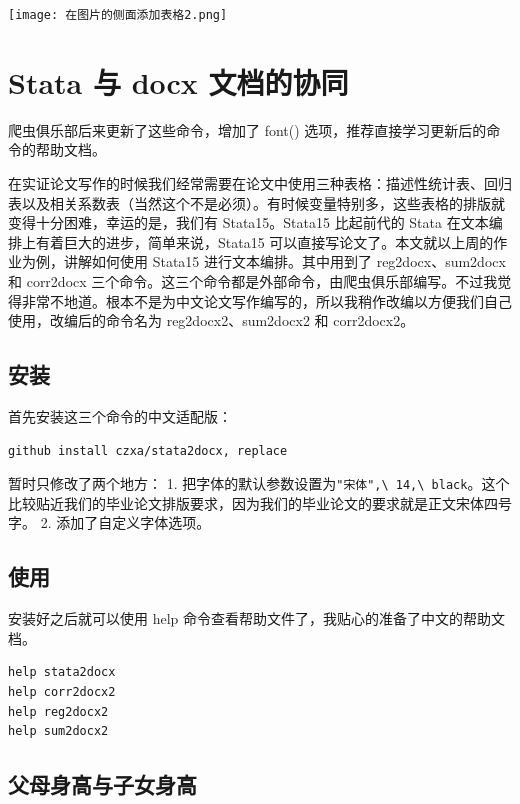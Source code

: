 \documentclass[cn,fancy,blue,11pt]{elegantbook}
\begin{document}
\noindent\texttt{[image: 在图片的侧面添加表格2.png]}

\hypertarget{stata--docx-}{%
\chapter{Stata 与 docx 文档的协同}\label{stata--docx-}}

\begin{note}
  爬虫俱乐部后来更新了这些命令，增加了 font() 选项，推荐直接学习更新后的命令的帮助文档。
\end{note}

在实证论文写作的时候我们经常需要在论文中使用三种表格：描述性统计表、回归表以及相关系数表（当然这个不是必须）。有时候变量特别多，这些表格的排版就变得十分困难，幸运的是，我们有 Stata15。Stata15 比起前代的 Stata 在文本编排上有着巨大的进步，简单来说，Stata15 可以直接写论文了。本文就以上周的作业为例，讲解如何使用 Stata15 进行文本编排。其中用到了 reg2docx、sum2docx 和 corr2docx 三个命令。这三个命令都是外部命令，由爬虫俱乐部编写。不过我觉得非常不地道。根本不是为中文论文写作编写的，所以我稍作改编以方便我们自己使用，改编后的命令名为 reg2docx2、sum2docx2 和 corr2docx2。

\hypertarget{section-40}{%
\section{安装}\label{section-40}}

首先安装这三个命令的中文适配版：

\begin{lstlisting}
github install czxa/stata2docx, replace
\end{lstlisting}

暂时只修改了两个地方：
1. 把字体的默认参数设置为\lstinline{"宋体",\ 14,\ black}。这个比较贴近我们的毕业论文排版要求，因为我们的毕业论文的要求就是正文宋体四号字。
2. 添加了自定义字体选项。

\hypertarget{section-41}{%
\section{使用}\label{section-41}}

安装好之后就可以使用 help 命令查看帮助文件了，我贴心的准备了中文的帮助文档。

\begin{lstlisting}
help stata2docx
help corr2docx2
help reg2docx2
help sum2docx2
\end{lstlisting}

\hypertarget{section-42}{%
\section{父母身高与子女身高}\label{section-42}}
\end{document}
